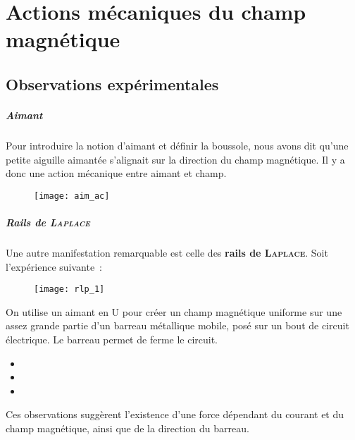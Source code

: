 \documentclass[../main/main.tex]{subfiles}
\begin{document}
\setcounter{chapter}{1}

\chapter{Actions mécaniques du champ magnétique}
\label{ch:ind_meca}
\section{Observations expérimentales}
\label{sec:obsexp}
\paragraph*{Aimant}
Pour introduire la notion d'aimant et définir la boussole, nous avons dit qu'une
petite aiguille aimantée s'alignait sur la direction du champ magnétique. Il y a
donc une action mécanique entre aimant et champ.

\begin{figure}[h]
	\centering
	\texttt{[image: aim\_ac]}
	\label{fig:aim_ac}
\end{figure}

\paragraph*{Rails de \textsc{Laplace}}
Une autre manifestation remarquable est celle des \textbf{rails de
	\textsc{Laplace}}. Soit l'expérience suivante~:
\begin{figure}[h]
	\centering
	\texttt{[image: rlp\_1]}
	\label{fig:rlp_1}
\end{figure}
On utilise un aimant en U pour créer un champ magnétique uniforme sur une assez
grande partie d'un barreau métallique mobile, posé sur un bout de circuit
électrique. Le barreau permet de ferme le circuit.
\begin{itemize}[label=$\diamond$, leftmargin=10pt]
	\item {}
	\item {}
	\item {}
\end{itemize}
Ces observations suggèrent l'existence d'une force dépendant du courant et du
champ magnétique, ainsi que de la direction du barreau.
\end{document}
